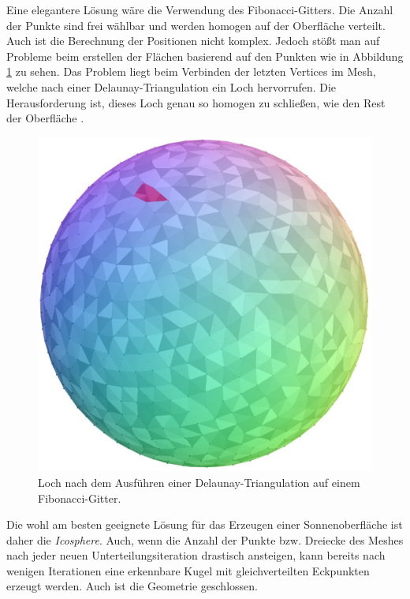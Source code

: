 Eine elegantere Lösung wäre die Verwendung des Fibonacci-Gitters. Die Anzahl
der Punkte sind frei wählbar und werden homogen auf der Oberfläche verteilt.
Auch ist die Berechnung der Positionen nicht komplex. Jedoch stößt man auf
Probleme beim erstellen der Flächen basierend auf den Punkten wie in
Abbildung \ref{fig:fibo-lattice-hole} zu sehen. Das Problem liegt beim
Verbinden der letzten Vertices im Mesh, welche nach einer
Delaunay-Triangulation ein Loch hervorrufen. Die Herausforderung ist, dieses
Loch genau so homogen zu schließen, wie den Rest der Oberfläche
\cite{RedBlobGames}.

\begin{figure}
  \includegraphics[width=\columnwidth]{fibonacci-sphere-hole}
  \caption{Loch nach dem Ausführen einer Delaunay-Triangulation auf einem Fibonacci-Gitter.}
  \label{fig:fibo-lattice-hole}
\end{figure}

Die wohl am besten geeignete Lösung für das Erzeugen einer Sonnenoberfläche
ist daher die \textit{Icosphere}. Auch, wenn die Anzahl der Punkte bzw. Dreiecke
des Meshes nach jeder neuen Unterteilungsiteration drastisch ansteigen, kann bereits
nach wenigen Iterationen eine erkennbare Kugel mit gleichverteilten Eckpunkten erzeugt
werden. Auch ist die Geometrie geschlossen.